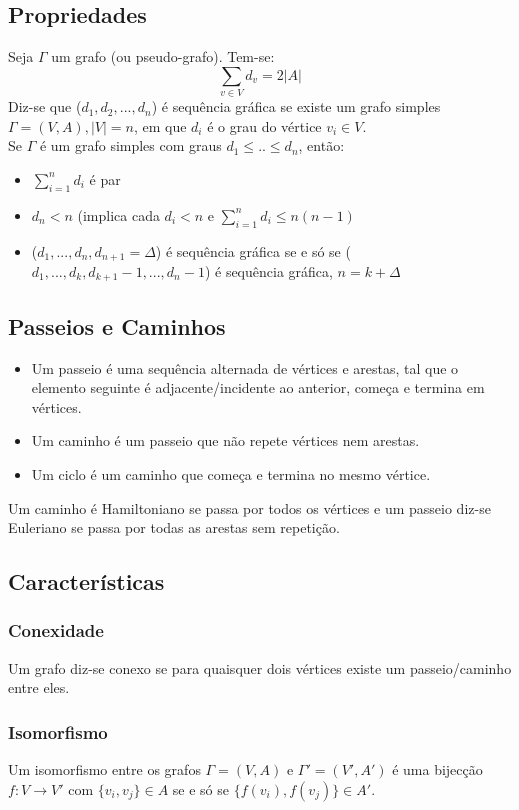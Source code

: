 \documentclass[10pt,a4paper]{report}
\begin{document}
\subsection{Propriedades}
Seja $\Gamma$ um grafo (ou pseudo-grafo). Tem-se:
$$
\sum_{v \in V} d_v = 2 |A|
$$
Diz-se que ($d_1, d_2, ..., d_n$) é sequência gráfica se existe um grafo simples $\Gamma = (V,A), |V| = n$, em que $d_i$ é o grau do vértice $v_i \in V$.\\
Se $\Gamma$ é um grafo simples com graus $d_1 \leq .. \leq d_n$, então:
\begin{itemize}
\item $\sum_{i = 1}^n d_i$ é par
\item $d_n < n$ (implica cada $d_i < n$ e $\sum_{i=1}^n d_i \leq n(n-1)$
\item ($d_1, ..., d_n, d_{n+1} = \Delta$) é sequência gráfica se e só se ($d_1, ..., d_k, d_{k+1} - 1, ..., d_n - 1$) é sequência gráfica, $n = k + \Delta$
\end{itemize}
\subsection{Passeios e Caminhos}
\begin{itemize}
\item Um passeio é uma sequência alternada de vértices e arestas, tal que o elemento seguinte é adjacente/incidente ao anterior, começa e termina em vértices.
\item Um caminho é um  passeio que não repete vértices nem arestas.
\item Um ciclo é um caminho que começa e termina no mesmo vértice.
\end{itemize}
Um caminho é Hamiltoniano se passa por todos os vértices e um passeio diz-se Euleriano se passa por todas as arestas sem repetição.
\subsection{Características}
\subsubsection{Conexidade}
Um grafo diz-se conexo se para quaisquer dois vértices existe um passeio/caminho entre eles.
\subsubsection{Isomorfismo}
Um isomorfismo entre os grafos $\Gamma = (V,A)$ e $\Gamma' = (V',A')$ é uma bijecção $f : V \rightarrow V'$ com $\{v_i,v_j\} \in A$ se e só se $\{f(v_i),f(v_j)\} \in A'$.
\end{document}

